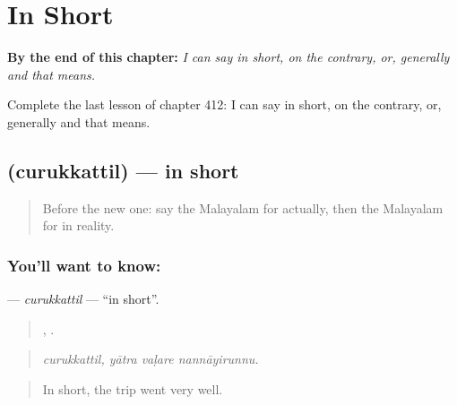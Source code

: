 
\chapter{In Short}
\label{ch:ml-in-short}

\begin{chapteropening}
\textbf{By the end of this chapter:} \emph{I can say in short, on the contrary, or, generally and that means.}

Complete the last lesson of chapter 412: I can say in short, on the contrary, or, generally and that means.
\end{chapteropening}

\section[\texorpdfstring{\ml{ചുരുക്കത്തിൽ} (curukkattil)}{ചുരുക്കത്തിൽ (curukkattil)}]{ (curukkattil) — in short}

\label{lesson:ML-C412-curukkattil}



\begin{quote}
Before the new one: say the Malayalam for actually, then the Malayalam for in reality.
\end{quote}

\subsection*{You'll want to know: }
\textbf{} — \emph{curukkattil} — \textquotedblleft{}in short\textquotedblright{}.

\begin{quote}
,   .
\end{quote}

\begin{quote}
\emph{curukkattil, yātra vaḷare nannāyirunnu.}
\end{quote}

\begin{quote}
In short, the trip went very well.
\end{quote}

